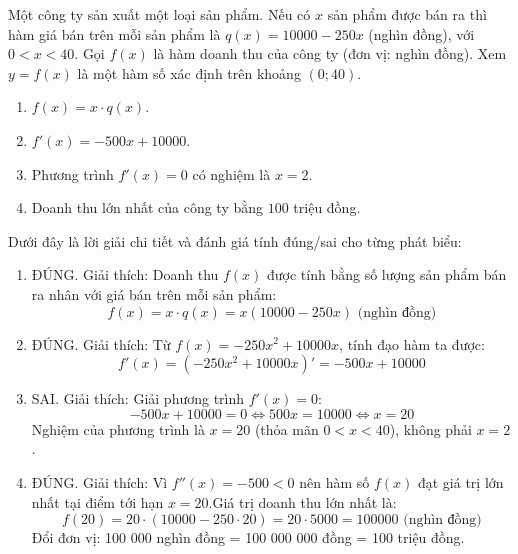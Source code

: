 \begin{baitap}
	Một công ty sản xuất một loại sản phẩm. Nếu có $x$ sản phẩm được bán ra thì hàm giá bán trên mỗi sản phẩm là $q(x) = 10000 - 250x$ (nghìn đồng), với $0 < x < 40$. Gọi $f(x)$ là hàm doanh thu của công ty (đơn vị: nghìn đồng). Xem $y = f(x)$ là một hàm số xác định trên khoảng $(0; 40)$. 
	\begin{enumerate}
		\item $f(x) = x \cdot q(x)$.
		\item $f'(x) = -500x + 10000$.
		\item Phương trình $f'(x) = 0$ có nghiệm là $x = 2$.
		\item Doanh thu lớn nhất của công ty bằng $100$ triệu đồng.
	\end{enumerate}
	\begin{traloi}
		
		Dưới đây là lời giải chi tiết và đánh giá tính đúng/sai cho từng phát biểu:
		\begin{enumerate}
			\item ĐÚNG. Giải thích: Doanh thu $f(x)$ được tính bằng số lượng sản phẩm bán ra nhân với giá bán trên mỗi sản phẩm:$$f(x) = x \cdot q(x) = x(10000 - 250x) \text{ (nghìn đồng)}$$
			\item ĐÚNG. Giải thích: Từ $f(x) = -250x^2 + 10000x$, tính đạo hàm ta được:$$f'(x) = (-250x^2 + 10000x)' = -500x + 10000$$
			\item SAI. Giải thích: Giải phương trình $f'(x) = 0$:$$-500x + 10000 = 0 \iff 500x = 10000 \iff x = 20$$Nghiệm của phương trình là $x = 20$ (thỏa mãn $0 < x < 40$), không phải $x = 2$.
			\item ĐÚNG. Giải thích: Vì $f''(x) = -500 < 0$ nên hàm số $f(x)$ đạt giá trị lớn nhất tại điểm tới hạn $x = 20$.Giá trị doanh thu lớn nhất là:$$f(20) = 20 \cdot (10000 - 250 \cdot 20) = 20 \cdot 5000 = 100000 \text{ (nghìn đồng)}$$Đổi đơn vị: 100 000 nghìn đồng = 100 000 000 đồng = 100 triệu đồng.
		\end{enumerate}
	\end{traloi}
\end{baitap}


